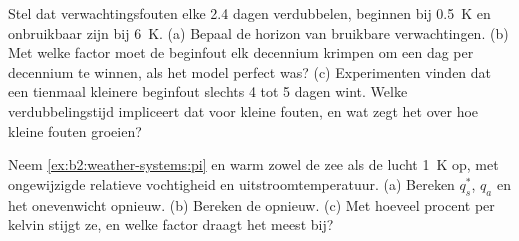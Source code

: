 \begin{exercise}[$\star\star\star$]\label{exo:b2:weather-systems:11}
Stel dat verwachtingsfouten elke 2.4 dagen verdubbelen, beginnen bij \qty{0.5}{K} en onbruikbaar zijn bij
\qty{6}{K}. (a) Bepaal de horizon van bruikbare verwachtingen. (b) Met welke factor moet de beginfout
elk decennium krimpen om een dag per decennium te winnen, als het model perfect was? (c) Experimenten vinden dat
een tienmaal kleinere beginfout slechts 4 tot 5 dagen wint. Welke verdubbelingstijd impliceert dat voor
kleine fouten, en wat zegt het over hoe kleine fouten groeien?
\end{exercise}

\begin{exercise}[$\star\star\star$]\label{exo:b2:weather-systems:12}
Neem \cref{ex:b2:weather-systems:pi} en warm zowel de zee als de lucht \qty{1}{K} op, met
ongewijzigde relatieve vochtigheid en uitstroomtemperatuur. (a) Bereken $q_s^*$, $q_a$ en het
onevenwicht opnieuw. (b) Bereken de  opnieuw. (c) Met hoeveel procent per kelvin
stijgt ze, en welke factor draagt het meest bij?
\end{exercise}

